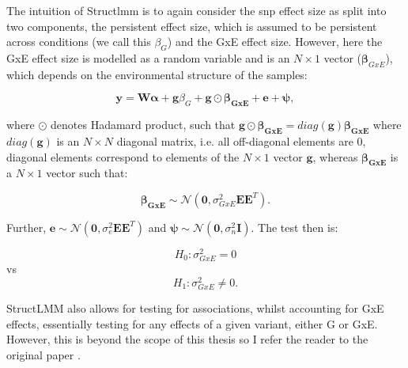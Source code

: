 The intuition of Struct\gls{lmm} is to again consider the \gls{snp} effect size as split into two components, the persistent effect size, which is assumed to be persistent across conditions (we call this $\beta_G$) and the GxE effect size. 
However, here the GxE effect size is modelled as a random variable and is an $N \times 1$ vector ($\boldsymbol{\beta}_{GxE}$), which depends on the environmental structure of the samples:

\begin{equation}\label{eq:StructLMM-int}
 \mathbf{y} =  \mathbf{W}\boldsymbol{\alpha} + \mathbf{g}\beta_G + \mathbf{g} \odot \boldsymbol{\beta_{GxE}} + \mathbf{e} + \boldsymbol{\psi}, 
\end{equation}

where $\odot$ denotes Hadamard product, such that $\mathbf{g} \odot \boldsymbol{\beta_{GxE}} = diag(\mathbf{g})\boldsymbol{\beta_{GxE}}$ where $diag(\mathbf{g})$ is an $N \times N$ diagonal matrix, i.e. all off-diagonal elements are 0, diagonal elements correspond to elements of the $N \times 1$ vector $\mathbf{g}$, whereas $\boldsymbol{\beta_{GxE}}$ is a $N \times 1$ vector such that:

\begin{equation}\label{eq:StructLMM-int_beta_GxE}
    \boldsymbol{\beta_{GxE}} \sim \mathcal{N}(\mathbf{0}, \sigma^2_{GxE}\mathbf{E}\mathbf{E}^T).
\end{equation}

Further, $\mathbf{e} \sim \mathcal{N}(\mathbf{0}, \sigma^2_{e}\mathbf{E}\mathbf{E}^T)$ and $\boldsymbol{\psi} \sim \mathcal{N}(\mathbf{0}, \sigma^2_{n}\mathbf{I})$. 
The test then is:

\begin{equation}\label{eq:StructLMM-int_H0}
 H_{0}: \sigma^2_{GxE}=0 
\end{equation}
vs
\begin{equation}\label{eq:StructLMM-int_H1}
 H_{1}: \sigma^2_{GxE} \neq 0. 
\end{equation}

StructLMM also allows for testing for associations, whilst accounting for GxE effects, essentially testing for any effects of a given variant, either G or GxE.
However, this is beyond the scope of this thesis so I refer the reader to the original paper \cite{moore2019linear}.\\

